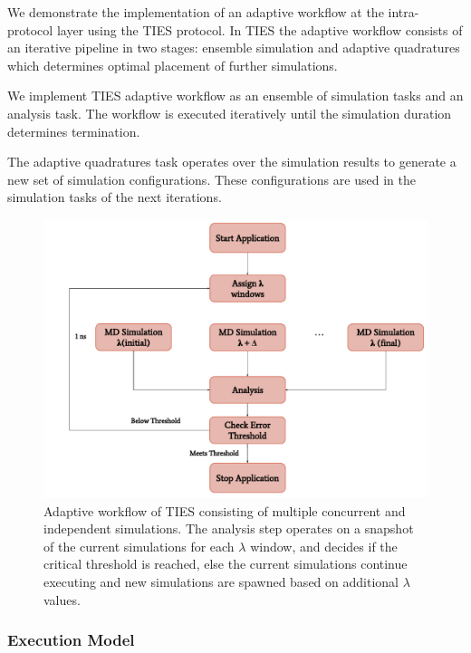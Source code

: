 
We demonstrate the implementation of an adaptive workflow at the intra-protocol 
layer using the TIES protocol. In TIES the adaptive workflow consists of an 
iterative pipeline in two stages: ensemble simulation and adaptive quadratures 
which determines optimal placement of further simulations. 

We implement TIES adaptive workflow as an ensemble of simulation tasks and 
an analysis task. The workflow is executed iteratively until the simulation 
duration determines termination. 

The adaptive quadratures task operates over the simulation results to generate
a new set of simulation configurations. These configurations are used in the 
simulation tasks of the next iterations. 

\begin{figure}
  \centering
  \includegraphics[width=\columnwidth]{figures/adaptive_TIES_workflow_diagram.pdf}
  \caption{Adaptive workflow of TIES consisting of multiple concurrent and
  independent simulations. The analysis step operates on a snapshot of the
  current simulations for each $\lambda$ window, and decides if the critical
  threshold is reached, else the current simulations continue executing and
  new simulations are spawned based on additional $\lambda$ values.}
\label{fig:adaptive_ties}
\end{figure}

\subsubsection{Execution Model}

